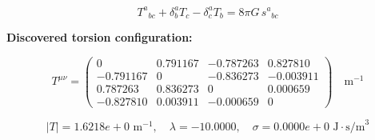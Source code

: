 
\begin{equation}
  T^a{}_{bc} + \delta^a_b T_c - \delta^a_c T_b = 8\pi G \, s^a{}_{bc}
\end{equation}

\textbf{Discovered torsion configuration:}

\begin{equation}
  T^{\mu\nu} = \begin{pmatrix}
    0 & 0.791167 & -0.787263 & 0.827810 \\
    -0.791167 & 0 & -0.836273 & -0.003911 \\
    0.787263 & 0.836273 & 0 & 0.000659 \\
    -0.827810 & 0.003911 & -0.000659 & 0
  \end{pmatrix} \quad \text{m}^{-1}
\end{equation}

\begin{equation}
  |T| = 1.6218e+0 \text{ m}^{-1}, \quad
  \lambda = -10.0000, \quad
  \sigma = 0.0000e+0 \text{ J}\cdot\text{s/m}^3
\end{equation}
